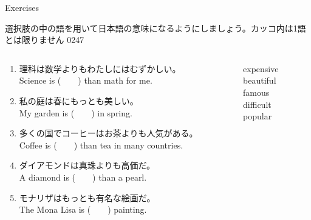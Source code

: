 \documentclass[aspectratio=169,xcolor={dvipsnames,table}]{beamer}
\begin{document}
\begin{frame}[plain]{Exercises}

{\small 選択肢の中の語を用いて日本語の意味になるようにしましょう。カッコ内は1語とは限りません}%
\hfill{\tiny 0247}\,{\scriptsize {}}
\begin{columns}[t]
 \begin{column}{.75\textwidth}
   \begin{enumerate}
  \item 理科は数学よりもわたしにはむずかしい。\\
	Science is (~~~~) than math for me.
  \item 私の庭は春にもっとも美しい。\\
	My garden is (~~~~) in spring.
  \item 多くの国でコーヒーはお茶よりも人気がある。\\
	Coffee is (~~~~) than tea in many countries.
  \item ダイアモンドは真珠よりも高価だ。\\
	A diamond is (~~~~) than a pearl.
  \item モナリザはもっとも有名な絵画だ。\\
	The Mona Lisa is (~~~~) painting.
 \end{enumerate}
 \end{column}
\begin{column}{.2\textwidth}
\begin{tcolorbox}
 expensive\\
beautiful\\
famous\\
difficult\\
popular
\end{tcolorbox}
\end{column}
\end{columns}
\end{frame}
\end{document}
